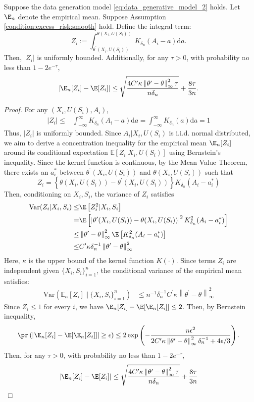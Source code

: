 \begin{lemma}\label{lemma:concentration_kernel_integral} Suppose the data generation model \eqref{eq:data_generative_model_2} holds. Let $\E_n$ denote the empirical mean. Suppose Assumption \ref{condition:excess_risk:smooth} hold. Define the integral term:
$$Z_i:=\int_{\theta^\prime(X_i,U(S_i))}^{\theta(X_i, U(S_i))}K_{\delta_n}(A_i-a)\mathrm{d}a.$$
Then, $|Z_i|$ is uniformly bounded. Additionally, for any $\tau>0$,  with probability no less than $1-2e^{-\tau}$, 
$$\left|\E_n[Z_i] - \E[Z_i]\right|\leq \sqrt{\frac{4C^\prime \kappa \left\|\theta^\prime - \theta\right\|^2_\infty  \tau}{n\delta_n}} + \frac{8\tau}{3n}.$$
\end{lemma}
\begin{proof}
For any $(X_i,U(S_i),A_i)$,
\begin{align*}
    |Z_i| \leq & \int_{-\infty}^{\infty} K_{\delta_n}(A_i-a)\mathrm{d}a = \int_{-\infty}^{\infty} K_{\delta_n}(a)\mathrm{d}a = 1
\end{align*}
Thus, $|Z_i|$ is uniformly bounded. Since $A_i|X_i,U(S_i)$ is i.i.d. normal distributed, we aim to derive a concentration inequality for the empirical mean $\E_n[Z_i]$ around its conditional expectation $\mathbb{E}[Z_i | X_i, U(S_i)]$ using Bernstein's inequality. Since the kernel function is continuous, by the Mean Value Theorem, there exists an $a_i^*$ between $\theta^\prime(X_i, U(S_i))$ and $\theta(X_i,U(S_i))$ such that
$$Z_i = \left\{\theta(X_i, U(S_i)) - \theta^\prime(X_i, U(S_i))\right\}K_{\delta_n}(A_i-a_i^*)$$
Then, conditioning on $X_i, S_i$, the variance of $Z_i$ satisfies
\begin{align*}
    \text{Var}(Z_i|X_i,S_i)
    \leq & \E\left[Z_i^2|X_i,S_i\right]\\
     = & \E\left[\left|\theta^\prime(X_i, U(S_i)) - \theta(X_i,U(S_i))\right|^2K^2_{\delta_n}(A_i-a^*_i)\right]\\
     \leq & \left\|\theta^\prime - \theta\right\|^2_\infty \E\left[K^2_{\delta_n}(A_i-a^*_i)\right]\\
     \leq &  C^\prime \kappa \delta_n^{-1}\left\|\theta^\prime - \theta\right\|^2_\infty  
\end{align*}
Here, $\kappa$ is the upper bound of the kernel function $K(\cdot)$. Since terms $Z_i$ are independent given $\{X_i,S_i\}_{i=1}^n$, the conditional variance of the empirical mean satisfies:
\begin{align*}
\text{Var}(\mathbb{E}_n[Z_i] \mid \{X_i, S_i\}_{i=1}^n) & \leq n^{-1}\delta_n^{-1} C^\prime \kappa \left\|\theta^\prime - \theta\right\|^2_\infty  
\end{align*}
 Since $Z_i\leq 1$ for every $i$, we have $\E_n[Z_i] - \E[\E_n[Z_i]]\leq 2$. Then, by Bernstein inequality, 
$$\pr\left(\left|\E_n[Z_i] - \E[\E_n[Z_i]]\right|\geq \epsilon\right)\leq 2\exp\left(-\frac{n\epsilon^2}{2C^\prime \kappa \left\|\theta^\prime - \theta\right\|^2_\infty  \delta_n^{-1} + 4\epsilon/3}\right).$$
Then, for any $\tau>0$, with probability no less than $1-2e^{-\tau}$, 
$$\left|\E_n[Z_i] - \E[Z_i]\right|\leq \sqrt{\frac{4C^\prime \kappa \left\|\theta^\prime - \theta\right\|^2_\infty  \tau}{n\delta_n}} + \frac{8\tau}{3n}$$


\end{proof}
